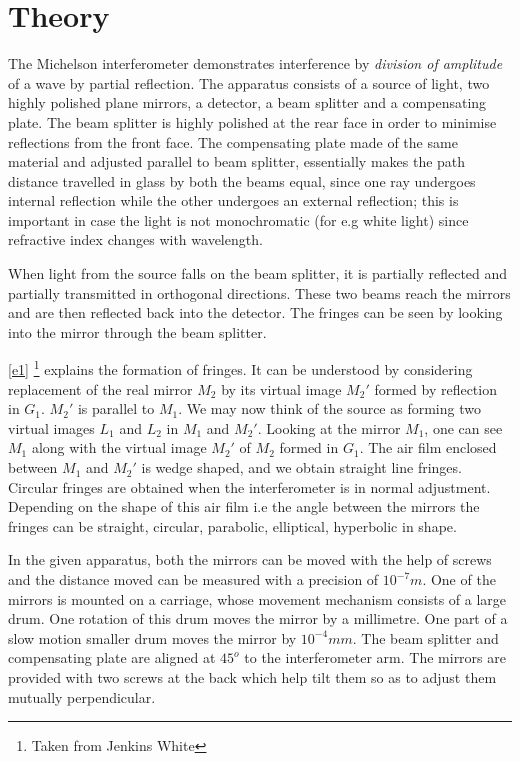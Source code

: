 \section{Theory}
	The Michelson interferometer demonstrates interference by \emph{division of amplitude} of a wave by partial reflection. The apparatus consists of a source of light, two highly polished plane mirrors, a detector, a beam splitter and a compensating plate. The beam splitter is highly polished at the rear face in order to minimise reflections from the front face. The compensating plate made of the same material and adjusted parallel to beam splitter, essentially makes the path distance travelled in glass by both the beams equal, since one ray undergoes internal reflection while the other undergoes an external reflection; this is important in case the light is not monochromatic (for e.g white light) since refractive index changes with wavelength. \\
	\par
	When light from the source falls on the beam splitter, it is partially reflected and partially transmitted in orthogonal directions. These two beams reach the mirrors and are then reflected back into the detector. The fringes can be seen by looking into the mirror through the beam splitter. \\
	\par
	\autoref{e1} \footnote{Taken from Jenkins White} explains the formation of fringes. It can be understood by considering replacement of the real mirror $M_2$ by its virtual image ${M_2}'$ formed by reflection in $G_1$. ${M_2}'$ is parallel to $M_1$. We may now think of the source as forming two virtual images $L_1$ and $L_2$ in $M_1$ and ${M_2}'$. Looking at the mirror $M_1$, one can see $M_1$ along with the virtual image ${M_2}'$ of  $M_2$ formed in  $G_1$. The air film enclosed between $M_1$ and ${M_2}'$ is wedge shaped, and we obtain straight line fringes. Circular fringes are obtained when the interferometer is in normal adjustment. Depending on the shape of this air film i.e the angle between the mirrors the fringes can be straight, circular, parabolic, elliptical, hyperbolic in shape. \\
	\par
	In the given apparatus, both the mirrors can be moved with the help of screws and the distance moved can be measured with a precision of $10^{-7}m$. One of the mirrors is mounted on a carriage, whose movement mechanism consists of a large drum. One rotation of this drum moves the mirror by a millimetre.  One part of a slow motion smaller drum moves the mirror by $10^{-4}mm$. The beam splitter and compensating plate are aligned at $45^{o}$ to the interferometer arm. The mirrors are provided with two screws at the back which help tilt them so as to adjust them mutually perpendicular. \\
